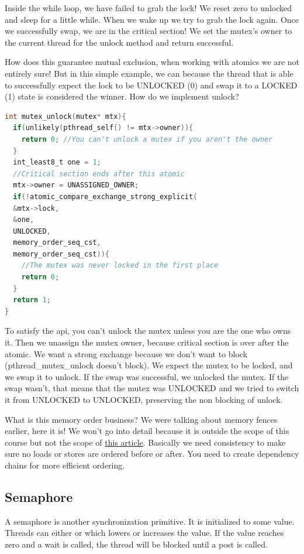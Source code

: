 Inside the while loop, we have failed to grab the lock!
We reset zero to unlocked and sleep for a little while.
When we wake up we try to grab the lock again.
Once we successfully swap, we are in the critical section!
We set the mutex's owner to the current thread for the unlock method and return successful.

How does this guarantee mutual exclusion, when working with atomics we are not entirely sure!
But in this simple example, we can because the thread that is able to successfully expect the lock to be UNLOCKED (0) and swap it to a LOCKED (1) state is considered the winner.
How do we implement unlock?

\begin{lstlisting}[language=C]
int mutex_unlock(mutex* mtx){
  if(unlikely(pthread_self() != mtx->owner)){
    return 0; //You can't unlock a mutex if you aren't the owner
  }
  int_least8_t one = 1;
  //Critical section ends after this atomic
  mtx->owner = UNASSIGNED_OWNER;
  if(!atomic_compare_exchange_strong_explicit(
  &mtx->lock,
  &one,
  UNLOCKED,
  memory_order_seq_cst,
  memory_order_seq_cst)){
    //The mutex was never locked in the first place
    return 0;
  }
  return 1;
}
\end{lstlisting}

To satisfy the api, you can't unlock the mutex unless you are the one who owns it.
Then we unassign the mutex owner, because critical section is over after the atomic.
We want a strong exchange because we don't want to block (pthread\_mutex\_unlock doesn't block).
We expect the mutex to be locked, and we swap it to unlock.
If the swap was successful, we unlocked the mutex.
If the swap wasn't, that means that the mutex was UNLOCKED and we tried to switch it from UNLOCKED to UNLOCKED, preserving the non blocking of unlock.

What is this memory order business?
We were talking about memory fences earlier, here it is!
We won't go into detail because it is outside the scope of this course but not the scope of \href{https://gcc.gnu.org/wiki/Atomic/GCCMM/AtomicSync}{this article}.
Basically we need consistency to make sure no loads or stores are ordered before or after.
You need to create dependency chains for more efficient ordering.

\subsection{Semaphore}

A semaphore is another synchronization primitive.
It is initialized to some value.
Threads can either  or  which lowers or increases the value.
If the value reaches zero and a wait is called, the thread will be blocked until a post is called.

